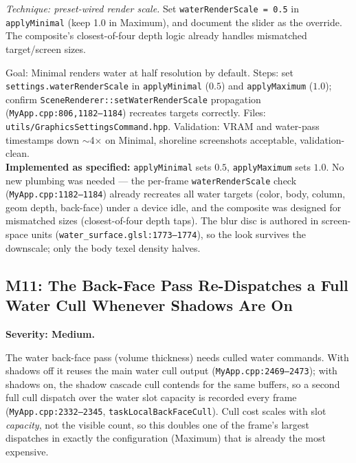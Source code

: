 \documentclass[11pt,a4paper]{article}
\begin{document}
\textit{Technique: preset-wired render scale.} Set \texttt{waterRenderScale =
0.5} in \texttt{applyMinimal} (keep 1.0 in Maximum), and document the slider
as the override. The composite's closest-of-four depth logic already handles
mismatched target/screen sizes.

\begin{tcolorbox}[promptbox={Prompt --- M10: wire waterRenderScale into the presets}]
Goal: Minimal renders water at half resolution by default. Steps: set
\texttt{settings.waterRenderScale} in \texttt{applyMinimal} ($0.5$) and
\texttt{applyMaximum} ($1.0$); confirm \texttt{SceneRenderer::setWaterRenderScale}
propagation (\texttt{MyApp.cpp:806,1182--1184}) recreates targets correctly.
Files: \texttt{utils/GraphicsSettingsCommand.hpp}. Validation: VRAM and water-pass
timestamps down $\sim$4$\times$ on Minimal, shoreline screenshots acceptable,
validation-clean.
\\ \textbf{Implemented as specified:} \texttt{applyMinimal} sets $0.5$,
\texttt{applyMaximum} sets $1.0$. No new plumbing was needed --- the
per-frame \texttt{waterRenderScale} check (\texttt{MyApp.cpp:1182--1184})
already recreates all water targets (color, body, column, geom depth,
back-face) under a device idle, and the composite was designed for
mismatched sizes (closest-of-four depth taps). The blur disc is authored in
screen-space units (\texttt{water\_surface.glsl:1773--1774}), so the look
survives the downscale; only the body texel density halves.
\end{tcolorbox}

\subsection{M11: The Back-Face Pass Re-Dispatches a Full Water Cull Whenever Shadows Are On}
\label{sec:m11}

\textbf{Severity: Medium.}

The water back-face pass (volume thickness) needs culled water commands. With
shadows off it reuses the main water cull output
(\texttt{MyApp.cpp:2469--2473}); with shadows on, the shadow cascade cull
contends for the same buffers, so a second full cull dispatch over the water
slot capacity is recorded every frame (\texttt{MyApp.cpp:2332--2345},
\texttt{taskLocalBackFaceCull}). Cull cost scales with slot \emph{capacity},
not the visible count, so this doubles one of the frame's largest dispatches
in exactly the configuration (Maximum) that is already the most expensive.
\end{document}
